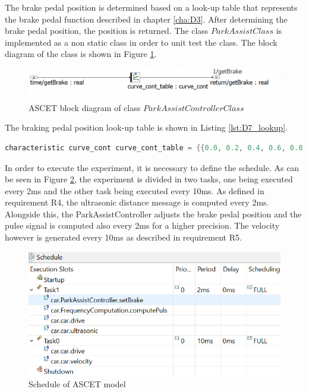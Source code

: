 The brake pedal position is determined based on a look-up table that represents the brake pedal function described in chapter \ref{cha:D3}. After determining the brake pedal position, the position is returned.  The class $ParkAssistClass$ is implemented as a non static class in order to unit test the class. The block diagram of the class is shown in Figure \ref{fig:BlockdiagrammParkAssistControllerClass}. 

\begin{figure}[H]
\centering
\includegraphics[width=1\textwidth]{images/Blockdiagramm_ParkAssistControllerClass.png}
\caption{ASCET block diagram of class $ParkAssistControllerClass$}
\label{fig:BlockdiagrammParkAssistControllerClass}
\end{figure}

The braking pedal position look-up table is shown in Listing \ref{lst:D7_lookup}. 

\begin{lstlisting}[language=Java,basicstyle=\scriptsize, caption= Braking pressure look up table,label= lst:D7_lookup]
characteristic curve_cont curve_cont_table = {{0.0, 0.2, 0.4, 0.6, 0.8, 1.0, 1.2}, {0.0, 0.043, 0.073, 0.078, 0.073, 0.043, 0.0}};
\end{lstlisting}

In order to execute the experiment, it is necessary to define the schedule. As can be seen in Figure \ref{fig:D7_schedule}, the experiment is divided in two tasks, one being executed every 2ms and the other task being executed every 10ms. As defined in requirement R4, the ultrasonic distance message is computed every 2ms. Alongside this, the ParkAssistController adjusts the brake pedal position and the pulse signal is computed also every 2ms for a higher precision. The velocity however is generated every 10ms as described in requirement R5.

\begin{figure}[H]
\centering
\includegraphics[width=1\textwidth]{images/pc_app.png}
\caption{Schedule of ASCET model}
\label{fig:D7_schedule}
\end{figure}

